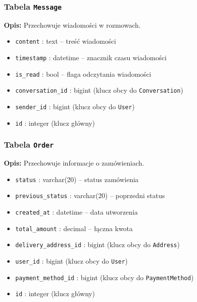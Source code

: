 \documentclass[12pt,a4paper,oneside]{article}
\theoremstyle{definition}
\numberwithin{equation}{section}
\begin{document}
\subsubsection*{Tabela \texttt{Message}}
\textbf{Opis:} Przechowuje wiadomości w rozmowach.
\begin{itemize}
    \item \texttt{content} : text – treść wiadomości
    \item \texttt{timestamp} : datetime – znacznik czasu wiadomości
    \item \texttt{is\string_read} : bool – flaga odczytania wiadomości
    \item \texttt{conversation\string_id} : bigint (klucz obcy do \texttt{Conversation})
    \item \texttt{sender\string_id} : bigint (klucz obcy do \texttt{User})
    \item \texttt{id} : integer (klucz główny)
\end{itemize}

\subsubsection*{Tabela \texttt{Order}}
\textbf{Opis:} Przechowuje informacje o zamówieniach.
\begin{itemize}
    \item \texttt{status} : varchar(20) – status zamówienia
    \item \texttt{previous\string_status} : varchar(20) – poprzedni status
    \item \texttt{created\string_at} : datetime – data utworzenia
    \item \texttt{total\string_amount} : decimal – łączna kwota
    \item \texttt{delivery\string_address\string_id} : bigint (klucz obcy do \texttt{Address})
    \item \texttt{user\string_id} : bigint (klucz obcy do \texttt{User})
    \item \texttt{payment\string_method\string_id} : bigint (klucz obcy do \texttt{PaymentMethod})
    \item \texttt{id} : integer (klucz główny)
\end{itemize}
\end{document}
